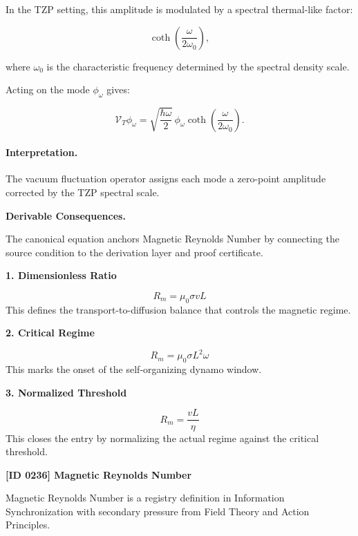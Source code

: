 In the TZP setting, this amplitude is modulated by a spectral thermal-like factor:

\begin{equation}
\coth\left(
\frac{\omega}{2\omega_0}
\right),
\end{equation}

where $\omega_0$ is the characteristic frequency determined by the spectral density scale.

Acting on the mode $\phi_{\omega}$ gives:

\begin{equation}
\boxed{
\mathcal{V}_T\phi_{\omega}
=
\sqrt{
\frac{\hbar\omega}{2}
}
\,\phi_{\omega}
\coth\left(
\frac{\omega}{2\omega_0}
\right).
}
\end{equation}

\paragraph{Interpretation.}
The vacuum fluctuation operator assigns each mode a zero-point amplitude corrected by the TZP spectral scale.

\par\vspace{0.35em}
\noindent\textbf{Derivable Consequences.}\quad
\begingroup
\footnotesize
\raggedright
The canonical equation anchors Magnetic Reynolds Number by connecting the source condition to the derivation layer and proof certificate.
\par\endgroup

\noindent\textbf{1. Dimensionless Ratio}\par
\[
R_m=\mu_0\sigma vL
\]
\noindent This defines the transport-to-diffusion balance that controls the magnetic regime.\par
\noindent\textbf{2. Critical Regime}\par
\[
R_m=\mu_0\sigma L^2\omega
\]
\noindent This marks the onset of the self-organizing dynamo window.\par
\noindent\textbf{3. Normalized Threshold}\par
\[
R_m=\frac{vL}{\eta}
\]
\noindent This closes the entry by normalizing the actual regime against the critical threshold.\par

\clearpage
\noindent\textbf{[ID 0236] Magnetic Reynolds Number}\par
\vspace{0.35em}
\begingroup\small
{}
Magnetic Reynolds Number is a registry definition in Information Synchronization with secondary pressure from Field Theory and Action Principles.

